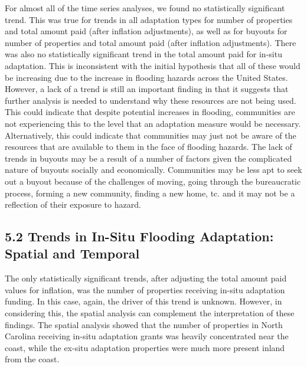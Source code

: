 \documentclass[
  12pt,
]{article}
\begin{document}
For almost all of the time series analyses, we found no statistically
significant trend. This was true for trends in all adaptation types for
number of properties and total amount paid (after inflation
adjustments), as well as for buyouts for number of properties and total
amount paid (after inflation adjustments). There was also no
statistically significant trend in the total amount paid for in-situ
adaptation. This is inconsistent with the initial hypothesis that all of
these would be increasing due to the increase in flooding hazards across
the United States. However, a lack of a trend is still an important
finding in that it suggests that further analysis is needed to
understand why these resources are not being used. This could indicate
that despite potential increases in flooding, communities are not
experiencing this to the level that an adaptation measure would be
necessary. Alternatively, this could indicate that communities may just
not be aware of the resources that are available to them in the face of
flooding hazards. The lack of trends in buyouts may be a result of a
number of factors given the complicated nature of buyouts socially and
economically. Communities may be less apt to seek out a buyout because
of the challenges of moving, going through the bureaucratic process,
forming a new community, finding a new home, tc. and it may not be a
reflection of their exposure to hazard.

\hypertarget{trends-in-in-situ-flooding-adaptation-spatial-and-temporal}{%
\subsection{5.2 Trends in In-Situ Flooding Adaptation: Spatial and
Temporal}\label{trends-in-in-situ-flooding-adaptation-spatial-and-temporal}}

The only statistically significant trends, after adjusting the total
amount paid values for inflation, was the number of properties receiving
in-situ adaptation funding. In this case, again, the driver of this
trend is unknown. However, in considering this, the spatial analysis can
complement the interpretation of these findings. The spatial analysis
showed that the number of properties in North Carolina receiving in-situ
adaptation grants was heavily concentrated near the coast, while the
ex-situ adaptation properties were much more present inland from the
coast.
\end{document}
